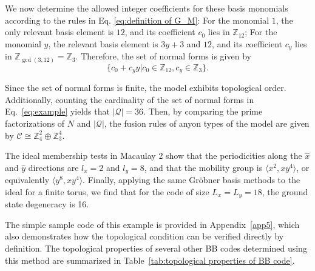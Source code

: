 \documentclass[aps,prb,english,superscriptaddress,twocolumn,tightenlines,showpacs,longbibliography,floatfix,amsfonts]{revtex4-2}
\begin{document}
We now determine the allowed integer coefficients for these basis monomials according to the rules in Eq. \eqref{eq:definition of G_M}: For the monomial $1$, the only relevant basis element is $12$, and its coefficient $c_0$ lies in $\mathbb{Z}_{12}$; For the monomial $y$, the relevant basis element is $3y+3$ and $12$, and its coefficient $c_y$ lies in $\mathbb{Z}_{\gcd(3,12)}=\mathbb{Z}_3$. Therefore, the set of normal forms is given by
\begin{equation}
    \{c_0+c_yy|c_0\in\mathbb{Z}_{12},c_{y}\in\mathbb{Z}_3\}.\label{eq:example}
\end{equation}
  
Since the set of normal forms is finite, the model exhibits topological order. Additionally, counting the cardinality of the set of normal forms in Eq.~\eqref{eq:example} yields that $|\mathcal{Q}|=36$. Then, by comparing the prime factorizations of $N$ and $|\mathcal{Q}|$,  the fusion rules of anyon types of the model are given by $\mathcal{C}\cong\mathbb{Z}_4^{2}\oplus \mathbb{Z}_3^{4}$.

The ideal membership tests in Macaulay 2 show that the periodicities along the $\hat{x}$ and $\hat{y}$ directions are $l_x=2$ and $l_y=8$, and that the mobility group is $\langle x^2,xy^4\rangle$, or equivalently $\langle y^8,xy^4\rangle$. Finally, applying the same Gr\"{o}bner basis methods to the ideal for a finite torus, we find that for the code of size $L_x=L_y=18$, the ground state degeneracy is 16.

The simple sample code of this example is provided in Appendix~\ref{app5}, which also demonstrates how the topological condition can be verified directly by definition. The topological properties of several other BB codes determined using this method are summarized in Table~\ref{tab:topological properties of BB code}.
\end{document}
